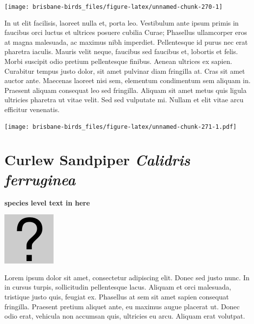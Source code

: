 \documentclass[]{book}
\let\origfigure\figure
\let\endorigfigure\endfigure
\renewenvironment{figure}[1][2] {
  \expandafter\origfigure\expandafter[H]
} {
  \endorigfigure
}
\begin{document}
\begin{figure}
\texttt{[image: brisbane-birds\_files/figure-latex/unnamed-chunk-270-1]} \caption{insert figure caption}\label{fig:unnamed-chunk-270}
\end{figure}

In ut elit facilisis, laoreet nulla et, porta leo. Vestibulum ante ipsum
primis in faucibus orci luctus et ultrices posuere cubilia Curae;
Phasellus ullamcorper eros at magna malesuada, ac maximus nibh
imperdiet. Pellentesque id purus nec erat pharetra iaculis. Mauris velit
neque, faucibus sed faucibus et, lobortis et felis. Morbi suscipit odio
pretium pellentesque finibus. Aenean ultrices ex sapien. Curabitur
tempus justo dolor, sit amet pulvinar diam fringilla at. Cras sit amet
auctor ante. Maecenas laoreet nisi sem, elementum condimentum sem
aliquam in. Praesent aliquam consequat leo sed fringilla. Aliquam sit
amet metus quis ligula ultricies pharetra ut vitae velit. Sed sed
vulputate mi. Nullam et elit vitae arcu efficitur venenatis.

\begin{figure}
\centering
\texttt{[image: brisbane-birds\_files/figure-latex/unnamed-chunk-271-1.pdf]}
\caption{\label{fig:unnamed-chunk-271}insert figure caption}
\end{figure}

\section{\texorpdfstring{Curlew Sandpiper \emph{Calidris
ferruginea}}{Curlew Sandpiper Calidris ferruginea}}\label{curlew-sandpiper-calidris-ferruginea}

\textbf{species level text in here}

\begin{figure}
\centering
\includegraphics{assets/missing.png}
\caption{No image for species}
\end{figure}

Lorem ipsum dolor sit amet, consectetur adipiscing elit. Donec sed justo
nunc. In in cursus turpis, sollicitudin pellentesque lacus. Aliquam et
orci malesuada, tristique justo quis, feugiat ex. Phasellus at sem sit
amet sapien consequat fringilla. Praesent pretium aliquet ante, eu
maximus augue placerat ut. Donec odio erat, vehicula non accumsan quis,
ultricies eu arcu. Aliquam erat volutpat.
\end{document}

